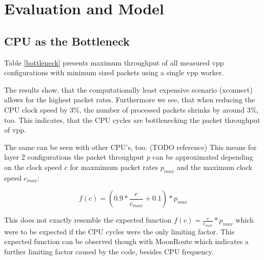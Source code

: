 \section{Evaluation and Model}







\subsection{CPU as the Bottleneck}
\label{sec:cpubottleneck}

Table \ref{bottleneck} presents maximum throughput of all
measured \Ac{vpp} configurations with minimum sized packets using a single \Ac{vpp}
worker. 

The results show, that the computationally least expensive scenario
(xconnect) allows for the highest packet rates. Furthermore we see,
that when reducing the CPU clock speed by 3\%, the number of processed
packets shrinks by around 3\%, too. This indicates, that the CPU
cycles are bottlenecking the packet throughput of \Ac{vpp}.

The same can be seen with other CPU's, too. (TODO reference) This
means for layer 2 configurations the packet throughput $p$ can be
approximated depending on the clock speed $c$ for maxmimum packet
rates $p_{max}$ and the maximum clock speed $c_{max}$:


$$ f(c) = (0.9 * \frac{c}{c_{max}} + 0.1) * p_{max} $$

This does not exactly resemble the expected function $f(c) =
\frac{c}{c_{max}} * p_{max}$ which were to be expected if the CPU
cycles were the only limiting factor. This expected function can be
observed though with MoonRoute \cite{chair:architecture} which
indicates a further limiting factor caused by the code, besides CPU
frequency.




